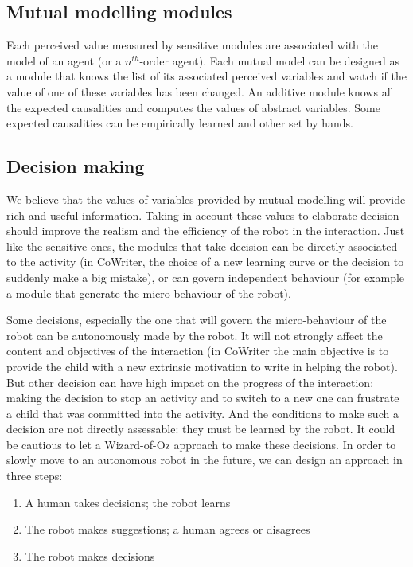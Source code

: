 \documentclass[10pt,a4paper,twocolumn]{article}
\begin{document}
\subsection{Mutual modelling modules}

Each perceived value measured by sensitive modules are associated with the model of an agent (or a $n^{th}$-order agent). Each mutual model can be designed as a module that knows the list of its associated perceived variables and watch if the value of one of these variables has been changed. An additive module knows all the expected causalities and computes the values of abstract variables. Some expected causalities can be empirically learned and other set by hands. 

\subsection{Decision making}

We believe that the values of variables provided by mutual modelling will provide rich and useful information. Taking in account these values to elaborate decision should improve the realism and the efficiency of the robot in the interaction.
Just like the sensitive ones, the modules that take decision can be directly associated to the activity (in CoWriter, the choice of a new learning curve or the decision to suddenly make a big mistake), or can govern independent behaviour (for example a module that generate the micro-behaviour of the robot).

Some decisions, especially the one that will govern the micro-behaviour of the robot can be autonomously made by the robot. It will not strongly affect the content and objectives of the interaction (in CoWriter the main objective is to provide the child with a new extrinsic motivation to write in helping the robot). But other decision can have high impact on the progress of the interaction: making the decision to stop an activity and to switch to a new one can frustrate a child that was committed into the activity. And the conditions to make such a decision are not directly assessable: they must be learned by the robot. It could be cautious to let a Wizard-of-Oz approach to make these decisions. In order to slowly move to an autonomous robot in the future, we can design an approach in three steps:
\begin{enumerate}
\item A human takes decisions; the robot learns
\item The robot makes suggestions; a human agrees or disagrees
\item The robot makes decisions
\end{enumerate}
\end{document}
